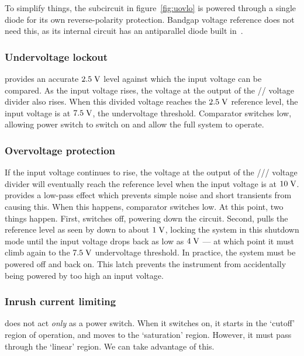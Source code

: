 To simplify things, the subcircuit in figure~\ref{fig:uovlo} is powered through
a single diode for its own reverse-polarity protection. Bandgap voltage reference
 does not need this, as its internal circuit has an antiparallel diode
built in~\cite{tl431}.

\subsubsection{Undervoltage lockout}

 provides an accurate $2.5\;\mathrm{V}$ level against which the input
voltage can be compared. As the input voltage rises, the voltage at the output of
the // voltage divider also rises. When
this divided voltage reaches the $2.5\;\mathrm{V}$ reference level, the input voltage
is at $7.5\;\mathrm{V}$, the undervoltage threshold. Comparator 
switches low, allowing power switch  to switch on and allow the
full system to operate.

\subsubsection{Overvoltage protection}

If the input voltage continues to rise, the voltage at the output of the
/// voltage divider will
eventually reach the reference level when the input voltage is at $10\;\mathrm{V}$.
 provides a low-pass effect which prevents simple noise and short
transients from causing this. When this happens, comparator 
switches low. At this point, two things happen. First,  switches
 off, powering down the circuit. Second,  pulls the
reference level as seen by  down to about $1\;\mathrm{V}$, locking
the system in this shutdown mode until the input voltage drops back as low
as $4\;\mathrm{V}$ --- at which point it must climb again to the $7.5\;\mathrm{V}$
undervoltage threshold. In practice, the system must be powered off and back
on. This latch prevents the instrument from accidentally being powered by
too high an input voltage.

\subsubsection{Inrush current limiting}

 does not act \emph{only} as a power switch. When it switches on,
it starts in the `cutoff' region of operation, and moves to the `saturation'
region. However, it must pass through the `linear' region. We can take
advantage of this.

